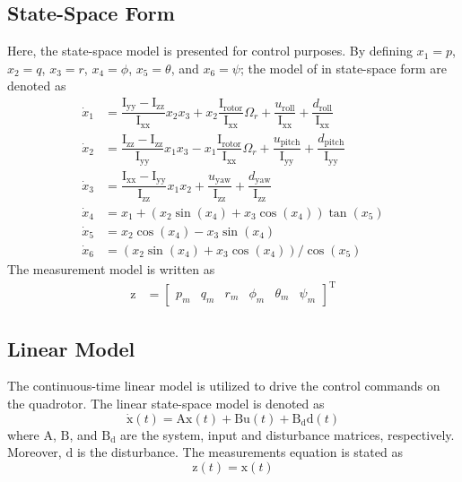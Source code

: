 \documentclass[conference]{IEEEtran}
\begin{document}
\subsection{State-Space Form}
\noindent Here, the state-space model is presented for control purposes.
By defining $x_1 = p$, $x_2 = q$, $x_3 = r$, $x_4 = \phi$, $x_5 = \theta$, and $x_6 = \psi$; the model of in state-space form are denoted as
\begin{align}\label{eq:diffeq}
		\dot x_1 &= \dfrac{\mathrm{I}_{\text{yy}} - \mathrm{I}_{\text{zz}}}{\mathrm{I}_{\text{xx}}} x_2 x_3 + x_2 \dfrac{\mathrm{I}_{\text{rotor}}}{\mathrm{I}_{\text{xx}}}\Omega_r + \dfrac{u_{\text{roll}}}{\mathrm{I}_{\text{xx}}} + \dfrac{d_{\text{roll}}}{\mathrm{I}_{\text{xx}}} \\
	\dot x_2 &= \dfrac{\mathrm{I}_{\text{zz}} - \mathrm{I}_{\text{zz}}}{\mathrm{I}_{\text{yy}}} x_1 x_3 - x_1 \dfrac{\mathrm{I}_{\text{rotor}}}{\mathrm{I}_{\text{xx}}}\Omega_r + \dfrac{u_{\text{pitch}}}{\mathrm{I}_{\text{yy}}} + \dfrac{d_{\text{pitch}}}{\mathrm{I}_{\text{yy}}}\\
	\dot x_3 &= \dfrac{\mathrm{I}_{\text{xx}} - \mathrm{I}_{\text{yy}}}{\mathrm{I}_{\text{zz}}} x_1 x_2 + \dfrac{u_{\text{yaw}}}{\mathrm{I}_{\text{zz}}} + \dfrac{d_{\text{yaw}}}{\mathrm{I}_{\text{zz}}}\\	
	\dot x_4 &= x_1 + (x_2\sin(x_4) + x_3\cos(x_4))\tan(x_5)
\\
	\dot x_5 &= x_2\cos(x_4) - x_3\sin(x_4)\\
	\dot x_6 &= (x_2\sin(x_4) + x_3\cos(x_4))/\cos(x_5) \label{eq:diffeq-end}
\end{align}
The measurement model is written as
\begin{equation}
	\begin{split}
		\boldsymbol{\mathrm{z}} &= \begin{bmatrix}
			p_m & q_m & r_m & \phi_m & \theta_m & \psi_m
		\end{bmatrix}^\mathrm{T}
	\end{split}
\end{equation}

\subsection{Linear Model}
\noindent The continuous-time linear model is utilized to drive the control commands on the quadrotor. The linear state-space model is denoted as
\begin{equation}\label{eq:linear}
	\boldsymbol{\dot{\mathrm{x}}}(t) = \boldsymbol{\mathrm{Ax}}(t) + \boldsymbol{\mathrm{Bu}}(t) + \boldsymbol{\mathrm{B_{d}d}}(t)
\end{equation}
where $\boldsymbol{\mathrm{A}}$, $\boldsymbol{\mathrm{B}}$, and $\boldsymbol{\mathrm{B_d}}$ are the system, input and disturbance matrices, respectively. Moreover, $\boldsymbol{\mathrm{d}}$ is the disturbance. The measurements equation is stated as
\begin{equation}
	\boldsymbol{{\mathrm{z}}}(t) = \boldsymbol{\mathrm{x}}(t)
\end{equation}
\end{document}

